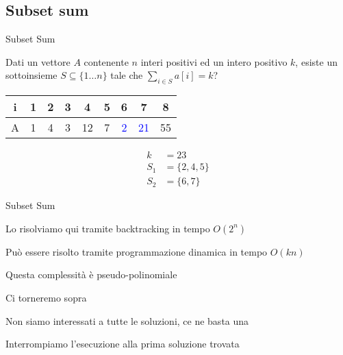 \subsection{Subset sum}

\begin{frame}{Subset Sum}

\vspace{-9pt}
\begin{myboxtitle}
Dati un vettore $A$ contenente $n$ interi positivi ed un intero positivo $k$, \alert{esiste} un sottoinsieme $S \subseteq \{ 1 \ldots n\}$ tale che 
$\displaystyle \sum_{i \in S} a[i] = k$?
\end{myboxtitle}

\bigskip
\begin{center}
\begin{tabular}{|c|c|c|c|c|c|c|c|c|}
\hline
i & 1 & 2 & 3 & 4 & 5 & 6 & 7 & 8 \\\hline
A & 1 & \alert{4} & 3 & \alert{12} & \alert{7} & \textcolor{blue}{2} &  \textcolor{blue}{21} & 55 \\\hline
\end{tabular}
\end{center}

\begin{align*}
  k &= 23\\
  S_1 &= \{ 2,4,5 \} \\
  S_2 &= \{ 6,7 \}
\end{align*}

\end{frame}

\begin{frame}{Subset Sum}

\vspace{-9pt}
\begin{myboxtitle}
\BIL
\item Lo risolviamo qui tramite backtracking in tempo $O(2^n)$
\item Può essere risolto tramite programmazione dinamica in tempo $O(kn)$
  \BI
  \item Questa complessità è pseudo-polinomiale
  \item Ci torneremo sopra
  \EI
\item \alert{Non siamo interessati a tutte le soluzioni, ce ne basta una}
\item \alert{Interrompiamo l'esecuzione alla prima soluzione trovata}
\EIL
\end{myboxtitle}

\end{frame}

